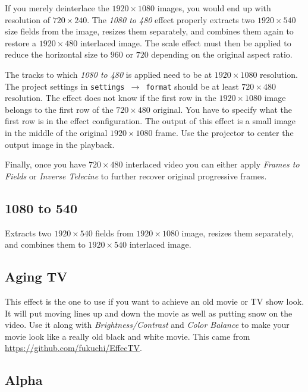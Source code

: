 If you merely deinterlace the $1920\times1080$ images, you would end up with resolution of $720\times240$. The \textit{1080 to 480} effect properly extracts two $1920\times540$ size fields from the image, resizes them separately, and combines them again to restore a $1920\times480$ interlaced image. The scale effect must then be applied to reduce the horizontal size to $960$ or $720$ depending on the original aspect ratio.

The tracks to which \textit{1080 to 480} is applied need to be at $1920\times1080$ resolution. The project settings in \texttt{settings $\rightarrow$ format} should be at least $720\times480$ resolution. The effect does not know if the first row in the $1920\times1080$ image belongs to the first row of the $720\times480$ original. You have to specify what the first row is in the effect configuration. The output of this effect is a small image in the middle of the original $1920\times1080$ frame. Use the projector to center the output image in the playback.

Finally, once you have $720\times480$ interlaced video you can either apply \textit{Frames to Fields} or \textit{Inverse Telecine} to further recover original progressive frames.

\subsection{1080 to 540}%
\label{sub:1080_to_540}

Extracts two $1920\times540$ fields from $1920\times1080$ image, resizes them separately, and combines them to $1920\times540$ interlaced image.

\subsection{Aging TV}%
\label{sub:aging_tv}

This effect is the one to use if you want to achieve an old movie or TV show look. It will put moving lines up and down the movie as well as putting snow on the video. Use it along with \textit{Brightness/Contrast} and \textit{Color Balance} to make your movie look like a really old black and white movie. This came from \url{https://github.com/fukuchi/EffecTV}.

\subsection{Alpha}%
\label{sub:alpha}

